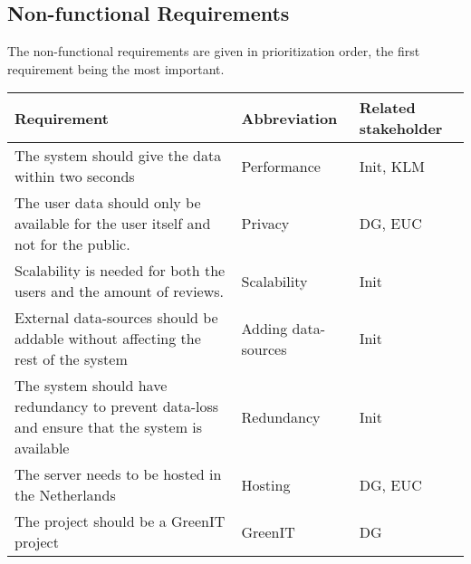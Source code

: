 \subsection*{Non-functional Requirements}
The non-functional requirements are given in prioritization order, the first requirement being the most important. 

\begin{longtable}{| p{10cm}| l | l |}
\hline
\textbf{Requirement} & \textbf{Abbreviation} & \textbf{Related stakeholder} \\ \hline
The system should give the data within two seconds & Performance & Init, KLM \\ \hline
The user data should only be available for the user itself and not for the public. & Privacy & DG, EUC \\ \hline
Scalability is needed for both the users and the amount of reviews.& Scalability & Init \\ \hline
External data-sources should be addable without affecting the rest of the system & Adding data-sources & Init \\ \hline
The system should have redundancy to prevent data-loss and ensure that the system is available & Redundancy & Init \\ \hline
The server needs to be hosted in the Netherlands & Hosting & DG, EUC \\ \hline
The project should be a GreenIT project & GreenIT & DG \\ \hline
\end{longtable}
